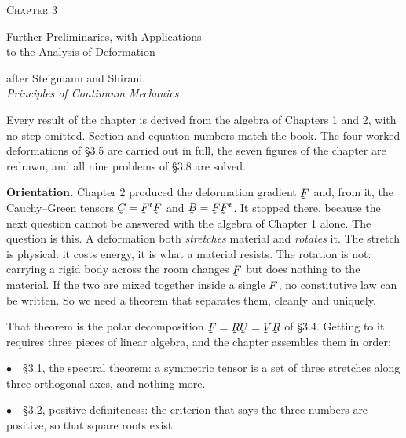 \documentclass[17pt,a4paper]{extreport}
\DeclareRobustCommand{\vek}[1]{\underaccent{\tilde}{#1}}
\newcommand{\bB}{\vek{B}}
\newcommand{\bC}{\vek{C}}
\newcommand{\bF}{\vek{F}}
\newcommand{\bR}{\vek{R}}
\newcommand{\bU}{\vek{U}}
\newcommand{\bV}{\vek{V}}
\theoremstyle{scplain}
\theoremstyle{scdefn}
\begin{document}
\begin{titlepage}
\centering
\vspace*{2.5cm}
{\Huge\scshape Chapter 3\par}
\vspace{0.8cm}
{\LARGE Further Preliminaries, with Applications\\[2mm]
 to the Analysis of Deformation\par}
\vspace{1.4cm}
{\large after Steigmann and Shirani,\\[1mm]
\emph{Principles of Continuum Mechanics}\par}
\vspace{1.6cm}
\begin{minipage}{0.86\textwidth}
{\large Every result of the chapter is derived from the algebra of
Chapters 1 and 2, with no step omitted. Section and equation numbers
match the book. The four worked deformations of \S3.5 are carried out in
full, the seven figures of the chapter are redrawn, and all nine problems
of \S3.8 are solved.\par}
\end{minipage}
\vfill
\end{titlepage}

\setcounter{chapter}{3}

\noindent
\textbf{\large Orientation.}\quad
Chapter 2 produced the deformation gradient $\bF$ and, from it, the
Cauchy--Green tensors $\bC=\bF^{t}\bF$ and $\bB=\bF\bF^{t}$. It stopped
there, because the next question cannot be answered with the algebra of
Chapter 1 alone. The question is this. A deformation both \emph{stretches}
material and \emph{rotates} it. The stretch is physical: it costs energy,
it is what a material resists. The rotation is not: carrying a rigid body
across the room changes $\bF$ but does nothing to the material. If the two
are mixed together inside a single $\bF$, no constitutive law can be
written. So we need a theorem that separates them, cleanly and uniquely.

That theorem is the polar decomposition $\bF=\bR\bU=\bV\bR$ of \S3.4.
Getting to it requires three pieces of linear algebra, and the chapter
assembles them in order:

\smallskip
\noindent
$\bullet$\ \ \S3.1, the spectral theorem: a symmetric tensor is a set of
three stretches along three orthogonal axes, and nothing more.

\noindent
$\bullet$\ \ \S3.2, positive definiteness: the criterion that says the
three numbers are positive, so that square roots exist.
\end{document}
